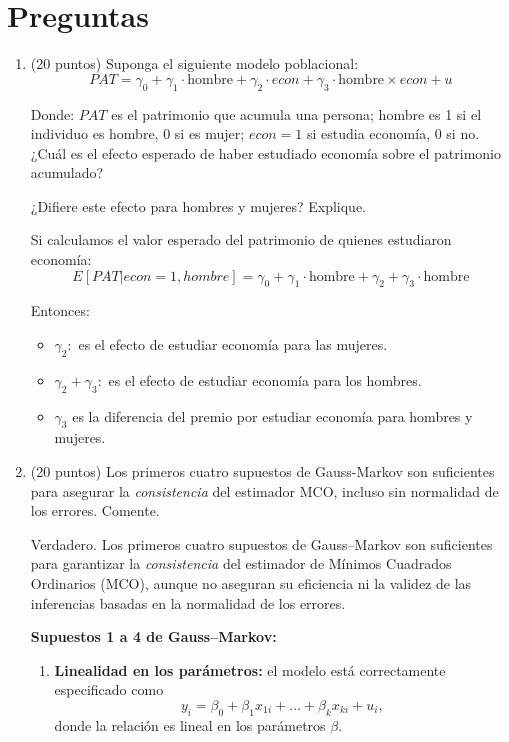 \documentclass[10pt,a4paper]{article}
\begin{document}
\section*{Preguntas}
\begin{enumerate}
\item (20 puntos) Suponga el siguiente modelo poblacional:
$$PAT = \gamma_0 + \gamma_1 \cdot \text{hombre} + \gamma_2 \cdot econ + \gamma_3 \cdot \text{hombre} \times econ +u$$

Donde: $PAT$ es el patrimonio que acumula una persona; hombre es 1 si el individuo es hombre, 0 si es mujer; $econ = 1$ si estudia economía, 0 si no.
 ¿Cuál es el efecto esperado de haber estudiado economía sobre el patrimonio acumulado?

¿Difiere este efecto para
hombres y mujeres? Explique.

    {\color{blue}
  Si calculamos el valor esperado del patrimonio de quienes estudiaron economía:
    $$E[PAT|econ=1,hombre] =  \gamma_0 + \gamma_1 \cdot \text{hombre}+\gamma_2 + \gamma_3 \cdot \text{hombre}$$


Entonces:

\begin{itemize}
    \item $\gamma_2:$ es el efecto de estudiar economía para las mujeres.
    \item $\gamma_2 + \gamma_3:$ es el efecto de estudiar economía para los hombres.
    \item $\gamma_3$ es la diferencia del premio por estudiar economía para hombres y mujeres.
    \end{itemize}}


    \item  (20 puntos)
    Los primeros cuatro supuestos de Gauss-Markov son suficientes para asegurar la \textit{consistencia} del estimador MCO, incluso sin normalidad de los errores. Comente.


{\color{blue}  Verdadero. Los primeros cuatro supuestos de Gauss--Markov son suficientes para garantizar la \textit{consistencia} del estimador de Mínimos Cuadrados Ordinarios (MCO), aunque no aseguran su eficiencia ni la validez de las inferencias basadas en la normalidad de los errores. 

\bigskip
\textbf{Supuestos 1 a 4 de Gauss--Markov:}
\begin{enumerate}
    \item \textbf{Linealidad en los parámetros:} el modelo está correctamente especificado como
    \[
    y_i = \beta_0 + \beta_1 x_{1i} + \dots + \beta_k x_{ki} + u_i,
    \]
    donde la relación es lineal en los parámetros \(\beta\).
    

\end{enumerate}}
\end{enumerate}
\end{document}
